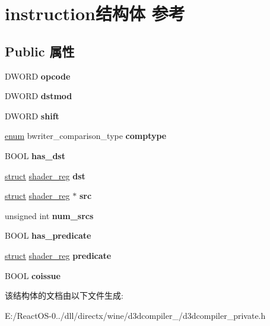 \hypertarget{structinstruction}{}\section{instruction结构体 参考}
\label{structinstruction}
\subsection*{Public 属性}
\begin{DoxyCompactItemize}
\item 
\mbox{\label{structinstruction_ad86526d6bf608df1da3ff5e4f3e8f844}} 
D\+W\+O\+RD {\bfseries opcode}
\item 
\mbox{\label{structinstruction_a585e8375c044a6f64400ae10b4c4dbd3}} 
D\+W\+O\+RD {\bfseries dstmod}
\item 
\mbox{\label{structinstruction_a67cc0bae9811aa5d003d171311e23dd6}} 
D\+W\+O\+RD {\bfseries shift}
\item 
\mbox{\label{structinstruction_a31a9b29af72b74e42f24da5c3ec440b9}} 
\hyperlink{interfaceenum}{enum} bwriter\+\_\+comparison\+\_\+type {\bfseries comptype}
\item 
\mbox{\label{structinstruction_ae74438e4a7f7d5f12244537cccabc297}} 
B\+O\+OL {\bfseries has\+\_\+dst}
\item 
\mbox{\label{structinstruction_ad73887eac8dcf4a2a70e6a204ec222b0}} 
\hyperlink{interfacestruct}{struct} \hyperlink{structshader__reg}{shader\+\_\+reg} {\bfseries dst}
\item 
\mbox{\label{structinstruction_ac9faafa9389ce4e36dc2f260e9584db9}} 
\hyperlink{interfacestruct}{struct} \hyperlink{structshader__reg}{shader\+\_\+reg} $\ast$ {\bfseries src}
\item 
\mbox{\label{structinstruction_a15469dfd21109d03b56c5062cf6d46e4}} 
unsigned int {\bfseries num\+\_\+srcs}
\item 
\mbox{\label{structinstruction_acdf137fd5f423e65ef274fd1aa901d2f}} 
B\+O\+OL {\bfseries has\+\_\+predicate}
\item 
\mbox{\label{structinstruction_a69481a15ab9f1ecb392298008107c010}} 
\hyperlink{interfacestruct}{struct} \hyperlink{structshader__reg}{shader\+\_\+reg} {\bfseries predicate}
\item 
\mbox{\label{structinstruction_a6e6842c1fb3ceaeac703cb234eec97b0}} 
B\+O\+OL {\bfseries coissue}
\end{DoxyCompactItemize}


该结构体的文档由以下文件生成\+:\begin{DoxyCompactItemize}
\item 
E\+:/\+React\+O\+S-\/0../dll/directx/wine/d3dcompiler\+\_/d3dcompiler\+\_\+private.\+h\end{DoxyCompactItemize}
